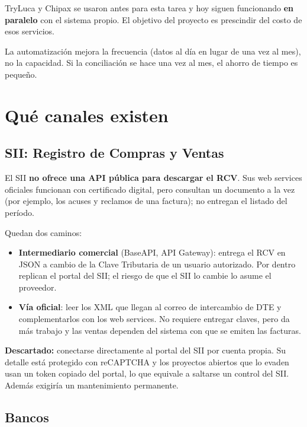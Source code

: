 \documentclass[11pt,a4paper]{article}
\begin{document}
TryLuca y Chipax se usaron antes para esta tarea y hoy siguen funcionando \textbf{en paralelo} con el sistema propio. El objetivo del proyecto es prescindir del costo de esos servicios.

La automatización mejora la frecuencia (datos al día en lugar de una vez al mes), no la capacidad. Si la conciliación se hace una vez al mes, el ahorro de tiempo es pequeño.

\section{Qué canales existen}

\subsection{SII: Registro de Compras y Ventas}

El SII \textbf{no ofrece una API pública para descargar el RCV}. Sus web services oficiales funcionan con certificado digital, pero consultan un documento a la vez (por ejemplo, los acuses y reclamos de una factura); no entregan el listado del período.

Quedan dos caminos:
\begin{itemize}
  \item \textbf{Intermediario comercial} (BaseAPI, API Gateway): entrega el RCV en JSON a cambio de la Clave Tributaria de un usuario autorizado. Por dentro replican el portal del SII; el riesgo de que el SII lo cambie lo asume el proveedor.
  \item \textbf{Vía oficial}: leer los XML que llegan al correo de intercambio de DTE y complementarlos con los web services. No requiere entregar claves, pero da más trabajo y las ventas dependen del sistema con que se emiten las facturas.
\end{itemize}

\begin{aviso}
\textbf{Descartado:} conectarse directamente al portal del SII por cuenta propia. Su detalle está protegido con reCAPTCHA y los proyectos abiertos que lo evaden usan un token copiado del portal, lo que equivale a saltarse un control del SII. Además exigiría un mantenimiento permanente.
\end{aviso}

\subsection{Bancos}
\end{document}

